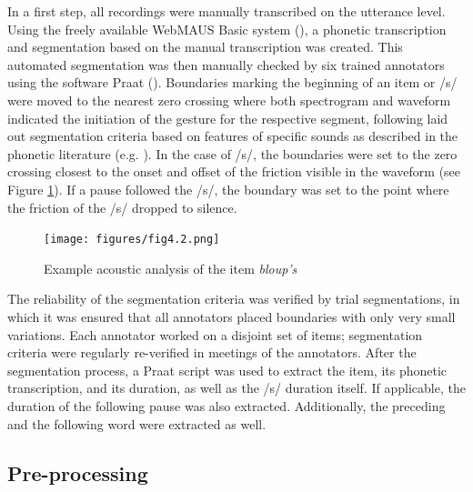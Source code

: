 In a first step, all recordings were manually transcribed on the utterance level. Using the freely available WebMAUS Basic system (\cite{Schiel1999, Kisler2017}), a phonetic transcription and segmentation based on the manual transcription was created. This automated segmentation was then manually checked by six trained annotators using the software Praat (\cite{Boersma2019}). Boundaries marking the beginning of an item or /s/ were moved to the nearest zero crossing where both spectrogram and waveform indicated the initiation of the gesture for the respective segment, following laid out segmentation criteria based on features of specific sounds as described in the phonetic literature (e.g. \cite{Ladefoged2003}). In the case of /s/, the boundaries were set to the zero crossing closest to the onset and offset of the friction visible in the waveform (see Figure \ref{fig:4_2}). If a pause followed the /s/, the boundary was set to the point where the friction of the /s/ dropped to silence. 

\begin{figure}
    \centering
    \texttt{[image: figures/fig4.2.png]}
    \caption{Example acoustic analysis of the item \textit{bloup’s}}
    \label{fig:4_2}
\end{figure}

The reliability of the segmentation criteria was verified by trial segmentations, in which it was ensured that all annotators placed boundaries with only very small variations. Each annotator worked on a disjoint set of items; segmentation criteria were regularly re-verified in meetings of the annotators. After the segmentation process, a Praat script was used to extract the item, its phonetic transcription, and its duration, as well as the /s/ duration itself. If applicable, the duration of the following pause was also extracted. Additionally, the preceding and the following word were extracted as well.

\subsection{Pre-processing}\label{section04_1_5}


